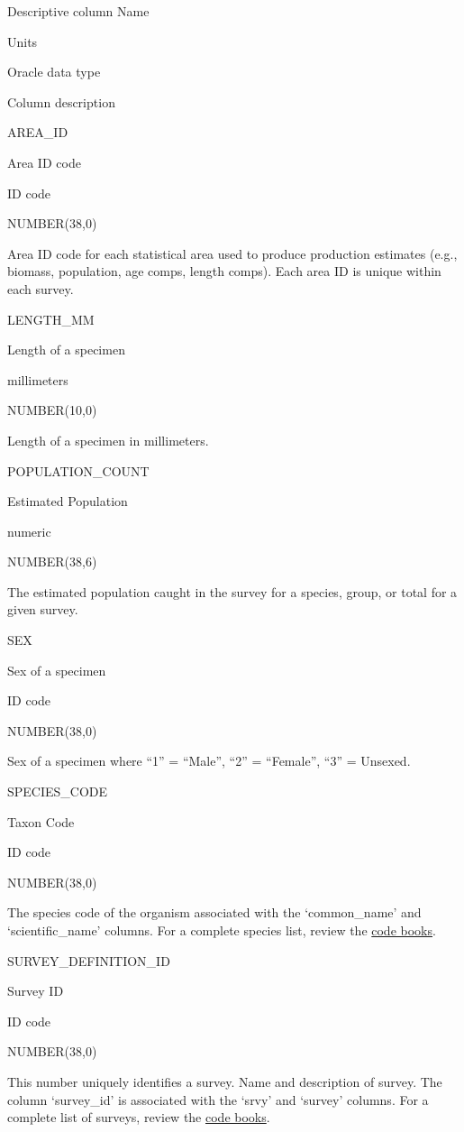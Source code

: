 \documentclass[
  letterpaper,
  oneside,
  open=any]{scrbook}
\begin{document}
Descriptive column Name

Units

Oracle data type

Column description

AREA\_ID

Area ID code

ID code

NUMBER(38,0)

Area ID code for each statistical area used to produce production
estimates (e.g., biomass, population, age comps, length comps). Each
area ID is unique within each survey.

LENGTH\_MM

Length of a specimen

millimeters

NUMBER(10,0)

Length of a specimen in millimeters.

POPULATION\_COUNT

Estimated Population

numeric

NUMBER(38,6)

The estimated population caught in the survey for a species, group, or
total for a given survey.

SEX

Sex of a specimen

ID code

NUMBER(38,0)

Sex of a specimen where ``1'' = ``Male'', ``2'' = ``Female'', ``3'' =
Unsexed.

SPECIES\_CODE

Taxon Code

ID code

NUMBER(38,0)

The species code of the organism associated with the `common\_name' and
`scientific\_name' columns. For a complete species list, review the
\href{https://www.fisheries.noaa.gov/resource/document/groundfish-survey-species-code-manual-and-data-codes-manual}{code
books}.

SURVEY\_DEFINITION\_ID

Survey ID

ID code

NUMBER(38,0)

This number uniquely identifies a survey. Name and description of
survey. The column `survey\_id' is associated with the `srvy' and
`survey' columns. For a complete list of surveys, review the
\href{https://www.fisheries.noaa.gov/resource/document/groundfish-survey-species-code-manual-and-data-codes-manual}{code
books}.
\end{document}
